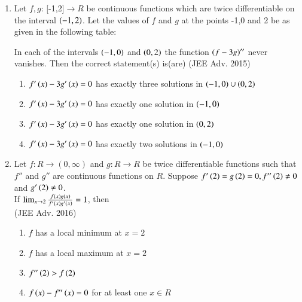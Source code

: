 \documentclass[journal,12pt,twocolumn]{IEEEtran}
\theoremstyle{remark}
\begin{document}
\begin{enumerate}
{        }
    \item{
        
            Let $f,g$: [-1,2]$\rightarrow R$ be continuous functions which are twice differentiable on the interval $\left(-1,2\right)$. Let the values of $f$ and $g$ at the points -1,0 and 2 be as given in the following table:
            
            In each of the intervals $\left(-1,0\right)$ and $\left(0,2\right)$ the function $\left(f-3g\right)''$ never vanishes. Then the correct statement(s) is(are)
             \hfill
                {(JEE Adv. 2015)}
            
            \begin{enumerate}
                \item $f'\left(x\right) - 3g'\left(x\right) = 0$ has exactly three solutions in $\left(-1,0\right)\cup\left(0,2\right)$
                \item $f'\left(x\right) - 3g'\left(x\right) = 0$ has exactly one solution in $\left(-1,0\right)$
                \item $f'\left(x\right) - 3g'\left(x\right) = 0$ has exactly one solution in $\left(0,2\right)$
                \item $f'\left(x\right) - 3g'\left(x\right) = 0$ has exactly two solutions in $\left(-1,0\right)$
            \end{enumerate}
        
        }
    \item{
        
            Let $f: R\rightarrow (0,\infty)$ and $g: R\rightarrow R$ be twice differentiable functions such that $f''$ and $g''$ are continuous functions on $R$. Suppose $f'\left(2\right) = g\left(2\right)=0, f''\left(2\right) \neq0$ and $g'\left(2\right)\neq0$.\\[6pt] If $\lim_{x\to2}  \frac{f\left(x\right)g\left(x\right)}{f'\left(x\right)g'\left(x\right)} = 1$, then \\
             \text{  }\hfill
                {(JEE Adv. 2016)}
            
            \begin{enumerate}
                \item $f$ has a local minimum at $x=2$
                \item $f$ has a local maximum at $x=2$
                \item $f''\left(2\right)>f\left(2\right)$
                \item $f\left(x\right) - f''\left(x\right) = 0$ for at least one $x\in R$
            \end{enumerate}
        
}
\end{enumerate}
\end{document}
